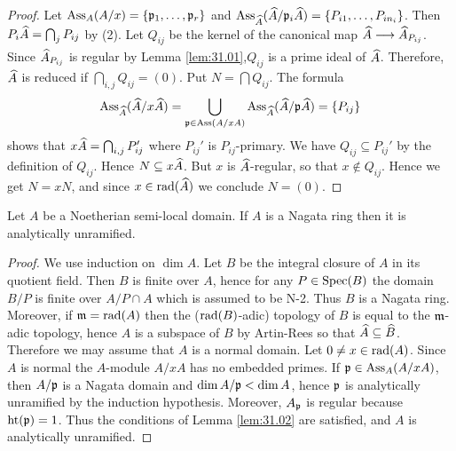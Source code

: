 \documentclass[../main]{subfiles}
\begin{document}
\begin{proof} Let $\operatorname{Ass}_A(A / x)=\{\mathfrak{p}_1, \dots, \mathfrak{p}_r\}$ and $\operatorname{Ass}_{\widehat{A}}(\widehat{A} / \mathfrak{p}_i \widehat{A})=\{P_{i 1}, \dots, P_{i n_i}\}$. Then $P_i \widehat{A}=\bigcap_j P_{i j}$ by (2). Let $Q_{i j}$ be the kernel of the canonical map \newline$\completion{A} \varrightarrow{} \completion{A}_{P_{i j}}$. Since $\widehat{A}_{ P_{i j}}$ is regular by Lemma \ref{lem:31.01},$Q_{i j}$ is a prime ideal of $\widehat{A}$. Therefore, $\widehat{A}$ is reduced if $\bigcap_{i, j} Q_{i j}=(0)$. Put $N=\bigcap Q_{i j}$. The formula \[\operatorname{Ass}_{\widehat{A}}(\widehat{A} / x \widehat{A})=\bigcup_{\mathfrak{p}\in \operatorname{Ass}(A/xA)} \operatorname{Ass}_{\widehat{A}} (\widehat{A}/\mathfrak{p}\widehat{A})= \{P_{ij}\}\]
shows that $x \widehat{A}=\bigcap_{i, j} P_{i j}'$ where $P_{i j}'$ is $P_{i j}$-primary. We have $Q_{i j} \subseteq P_{i j}'$ by the definition of $Q_{ij}$. Hence $N \subseteq x \widehat{A}$. But $x$ is $\widehat{A}$-regular, so that $x \notin Q_{i j}$. Hence we get $N=x N$, and since $x \in \operatorname{rad}(\widehat{A})$ we conclude $N=(0)$.
\end{proof}
\begin{theorem}\label{thm:070} Let $A$ be a Noetherian semi-local domain. If $A$ is a Nagata ring then it is analytically unramified.\end{theorem}
\begin{proof} 
We use induction on $\dim A$. Let $B$ be the integral closure of $A$ in its quotient field. Then $B$ is finite over $A$, hence for any $P \in \operatorname{Spec}(B)$ the domain $B / P$ is finite over $A / P \cap A$ which is assumed to be N-2. Thus $B$ is a Nagata ring. Moreover, if $\mathfrak{m}=\operatorname{rad}(A)$ then the ($\operatorname{rad}(B)$-adic) topology of $B$ is equal to the $\mathfrak{m}$-adic topology, hence $A$ is a subspace of $B$ by Artin-Rees so that $\widehat{A} \subseteq \widehat{B}$. Therefore we may assume that $A$ is a normal domain. Let $0 \neq x \in \operatorname{rad}(A)$. Since $A$ is normal the $A$-module $A / x A$ has no embedded primes. If $\mathfrak{p}\in \operatorname{Ass}_{A}(A / x A)$, then $A / \mathfrak{p}$ is a Nagata domain and $\operatorname{dim} A / \mathfrak{p}<\operatorname{dim} A$, hence $\mathfrak{p}$ is analytically unramified by the induction hypothesis. Moreover, $A_{\mathfrak{p}}$ is regular because $\operatorname{ht}(\mathfrak{p})=1$. Thus the conditions of Lemma \ref{lem:31.02} are satisfied, and $A$ is analytically unramified. \end{proof}
\end{document}
